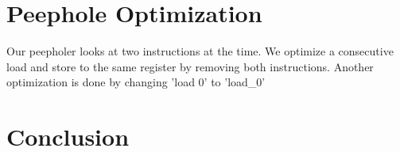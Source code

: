 \documentclass[a4paper]{article}
\begin{document}
\section{Peephole Optimization}
Our peepholer looks at two instructions at the time. We optimize a consecutive
load and store to the same register by removing both instructions.
Another optimization is done by changing 'load 0' to 'load\_0'



\section{Conclusion}





\end{document}
